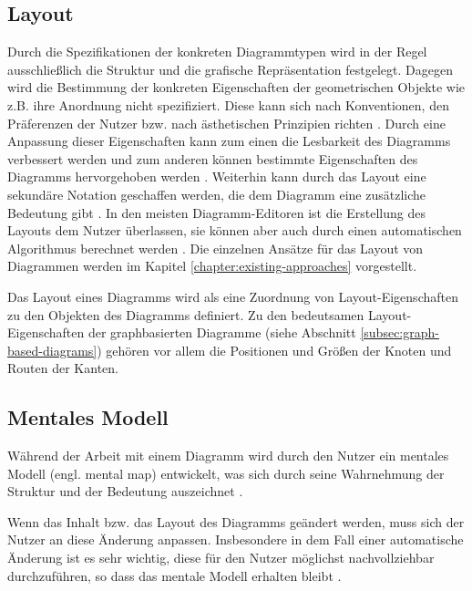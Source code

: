 \subsection{Layout}
\label{subsec:layout}

Durch die Spezifikationen der konkreten Diagrammtypen wird in der Regel ausschließlich die Struktur und die grafische Repräsentation festgelegt. Dagegen wird die Bestimmung der konkreten Eigenschaften der geometrischen Objekte wie z.B. ihre Anordnung nicht spezifiziert. Diese kann sich nach Konventionen, den Präferenzen der Nutzer bzw. nach ästhetischen Prinzipien richten \cite{Maier12A-Pattern-based, Wybrow08Using}. Durch eine Anpassung dieser Eigenschaften kann zum einen die Lesbarkeit des Diagramms verbessert werden und zum anderen können bestimmte Eigenschaften des Diagramms hervorgehoben werden \cite{Maier12A-Pattern-based}. Weiterhin kann durch das Layout eine sekundäre Notation geschaffen werden, die dem Diagramm eine zusätzliche Bedeutung gibt \cite{SeyboldGlinz03An-Effective}. In den meisten Diagramm-Editoren ist die Erstellung des Layouts dem Nutzer überlassen, sie können aber auch durch einen automatischen Algorithmus berechnet werden \cite{Maier12A-Pattern-based}. Die einzelnen Ansätze für das Layout von Diagrammen werden im Kapitel \ref{chapter:existing-approaches} vorgestellt.

Das Layout eines Diagramms wird als eine Zuordnung von Layout-Eigenschaften zu den Objekten des Diagramms definiert. Zu den bedeutsamen Layout-Eigenschaften der graphbasierten Diagramme (siehe Abschnitt \ref{subsec:graph-based-diagrams}) gehören vor allem die Positionen und Größen der Knoten und Routen der Kanten.

\subsection{Mentales Modell}
\label{subsec:mental-map}

Während der Arbeit mit einem Diagramm wird durch den Nutzer ein mentales Modell (engl. mental map) entwickelt, was sich durch seine Wahrnehmung der Struktur und der Bedeutung auszeichnet \cite{Branke01Dynamic, GladischSchumann14Semi-Automatic}.

Wenn das Inhalt bzw. das Layout des Diagramms geändert werden, muss sich der Nutzer an diese Änderung anpassen. Insbesondere in dem Fall einer automatische Änderung ist es sehr wichtig, diese für den Nutzer möglichst nachvollziehbar durchzuführen, so dass das mentale Modell erhalten bleibt \cite{Branke01Dynamic, Maier12A-Pattern-based}.

